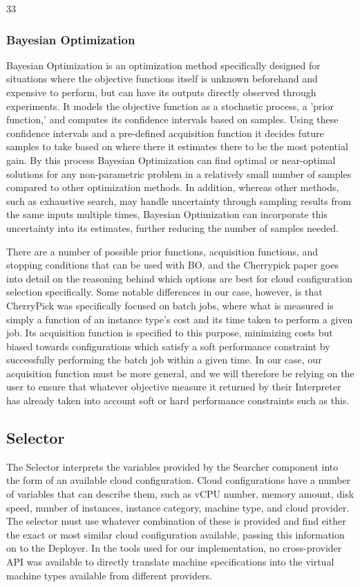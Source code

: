 33\documentclass{article}
\begin{document}
\subsubsection{Bayesian Optimization}
Bayesian Optimization is an optimization method specifically designed for situations where the objective functions itself is unknown beforehand and expensive to perform, but can have its outputs directly observed through experiments\cite{Snoek2012}. It models the objective function as a stochastic process, a 'prior function,' and computes its confidence intervals based on samples. Using these confidence intervals and a pre-defined acquisition function it decides future samples to take based on where there it estimates there to be the most potential gain. By this process Bayesian Optimization can find optimal or near-optimal solutions for any non-parametric problem in a relatively small number of samples compared to other optimization methods. In addition, whereas other methods, such as exhaustive search, may handle uncertainty through sampling results from the same inputs multiple times, Bayesian Optimization can incorporate this uncertainty into its estimates, further reducing the number of samples needed.

There are a number of possible prior functions, acquisition functions, and stopping conditions that can be used with BO, and the Cherrypick paper goes into detail on the reasoning behind which options are best for cloud configuration selection specifically\cite{Alipourfard2017}. Some notable differences in our case, however, is that CherryPick was specifically focused on batch jobs, where what is measured is simply a function of an instance type's cost and its time taken to perform a given job. Its acquisition function is specified to this purpose, minimizing costs but biased towards configurations which satisfy a soft performance constraint by successfully performing the batch job within a given time. In our case, our acquisition function must be more general, and we will therefore be relying on the user to ensure that whatever objective measure it returned by their Interpreter has already taken into account soft or hard performance constraints such as this.

\subsection{Selector}
The Selector interprets the variables provided by the Searcher component into the form of an available cloud configuration. Cloud configurations have a number of variables that can describe them, such as vCPU number, memory amount, disk speed, number of instances, instance category, machine type, and cloud provider. The selector must use whatever combination of these is provided and find either the exact or most similar cloud configuration available, passing this information on to the Deployer. In the tools used for our implementation, no cross-provider API was available to directly translate machine specifications into the virtual machine types available from different providers. 
\end{document}

